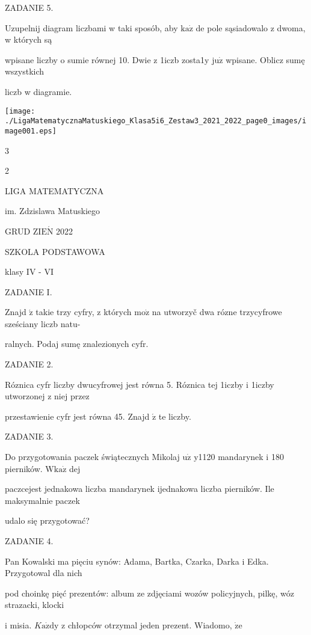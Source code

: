 \documentclass[a4paper,12pt]{article}
\begin{document}
ZADANIE 5.

Uzupelnij diagram liczbami w taki sposób, aby $\mathrm{k}\mathrm{a}\dot{\mathrm{z}}$ de pole sąsiadowalo z dwoma, w których są

wpisane liczby o sumie równej 10. Dwie z 1iczb zosta1y $\mathrm{j}\mathrm{u}\dot{\mathrm{z}}$ wpisane. Oblicz sumę wszystkich

liczb w diagramie.
\begin{center}
\texttt{[image: ./LigaMatematycznaMatuskiego\_Klasa5i6\_Zestaw3\_2021\_2022\_page0\_images/image001.eps]}
\end{center}
3

2






LIGA MATEMATYCZNA

im. Zdzislawa Matuskiego

GRUD Z$\mathrm{I}\mathrm{E}\acute{\mathrm{N}}$ 2022

SZKOLA PODSTAWOWA

klasy IV - VI

ZADANIE I.

Znajd $\acute{\mathrm{z}}$ takie trzy cyfry, z których $\mathrm{m}\mathrm{o}\dot{\mathrm{z}}$ na utworzyč dwa rózne trzycyfrowe sześciany liczb natu-

ralnych. Podaj sumę znalezionych cyfr.

ZADANIE 2.

Róznica cyfr liczby dwucyfrowej jest równa 5. Róznica tej 1iczby i 1iczby utworzonej z niej przez

przestawienie cyfr jest równa 45. Znajd $\acute{\mathrm{z}}$ te liczby.

ZADANIE 3.

Do przygotowania paczek świątecznych Mikolaj $\mathrm{u}\dot{\mathrm{z}}$ y1120 mandarynek i 180 pierników. $\mathrm{W}\mathrm{k}\mathrm{a}\dot{\mathrm{z}}$ dej

paczcejest jednakowa liczba mandarynek ijednakowa liczba pierników. Ile maksymalnie paczek

udalo się przygotować?

ZADANIE 4.

Pan Kowalski ma pięciu synów: Adama, Bartka, Czarka, Darka i Edka. Przygotowal dla nich

pod choinkę pięć prezentów: album ze zdjęciami wozów policyjnych, pilkę, wóz strazacki, klocki

i misia. $K\mathrm{a}\dot{\mathrm{z}}\mathrm{d}\mathrm{y}$ z chłopców otrzymal jeden prezent. Wiadomo, $\dot{\mathrm{z}}\mathrm{e}$
\end{document}
